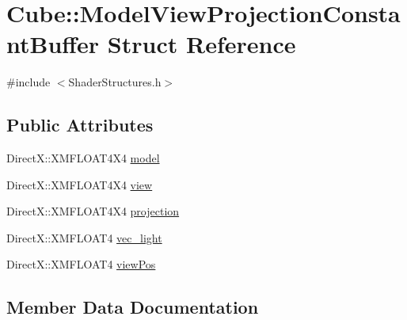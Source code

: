 \hypertarget{struct_cube_1_1_model_view_projection_constant_buffer}{}\section{Cube\+:\+:Model\+View\+Projection\+Constant\+Buffer Struct Reference}
\label{struct_cube_1_1_model_view_projection_constant_buffer}


{\ttfamily \#include $<$Shader\+Structures.\+h$>$}

\subsection*{Public Attributes}
\begin{DoxyCompactItemize}
\item 
Direct\+X\+::\+X\+M\+F\+L\+O\+A\+T4\+X4 \hyperlink{struct_cube_1_1_model_view_projection_constant_buffer_a1a7ffc14e72945bd0ece96ef5954d9a5}{model}
\item 
Direct\+X\+::\+X\+M\+F\+L\+O\+A\+T4\+X4 \hyperlink{struct_cube_1_1_model_view_projection_constant_buffer_a43f3448b822ee84ab49e40cbf74cd3e1}{view}
\item 
Direct\+X\+::\+X\+M\+F\+L\+O\+A\+T4\+X4 \hyperlink{struct_cube_1_1_model_view_projection_constant_buffer_a81ad61fe5f418f01da4fd9667975a6e4}{projection}
\item 
Direct\+X\+::\+X\+M\+F\+L\+O\+A\+T4 \hyperlink{struct_cube_1_1_model_view_projection_constant_buffer_ac6b5249e850b2f3deef3d8fc20614e85}{vec\+\_\+light}
\item 
Direct\+X\+::\+X\+M\+F\+L\+O\+A\+T4 \hyperlink{struct_cube_1_1_model_view_projection_constant_buffer_ab67504141f43910f88d78ebebf0f30a0}{view\+Pos}
\end{DoxyCompactItemize}


\subsection{Member Data Documentation}
\mbox{\label{struct_cube_1_1_model_view_projection_constant_buffer_a1a7ffc14e72945bd0ece96ef5954d9a5}} 
